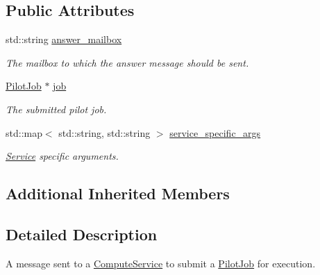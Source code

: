 \subsection*{Public Attributes}
\begin{DoxyCompactItemize}
\item 
\mbox{\label{classwrench_1_1_compute_service_submit_pilot_job_request_message_a7f6ae704e92a873bcaaa87972b66e420}} 
std\+::string \hyperlink{classwrench_1_1_compute_service_submit_pilot_job_request_message_a7f6ae704e92a873bcaaa87972b66e420}{answer\+\_\+mailbox}
\begin{DoxyCompactList}\small\item\em The mailbox to which the answer message should be sent. \end{DoxyCompactList}\item 
\mbox{\label{classwrench_1_1_compute_service_submit_pilot_job_request_message_a07c2cfde168dec83195c0836671acbe7}} 
\hyperlink{classwrench_1_1_pilot_job}{Pilot\+Job} $\ast$ \hyperlink{classwrench_1_1_compute_service_submit_pilot_job_request_message_a07c2cfde168dec83195c0836671acbe7}{job}
\begin{DoxyCompactList}\small\item\em The submitted pilot job. \end{DoxyCompactList}\item 
\mbox{\label{classwrench_1_1_compute_service_submit_pilot_job_request_message_af88e80196f64d6530548dbe17df006de}} 
std\+::map$<$ std\+::string, std\+::string $>$ \hyperlink{classwrench_1_1_compute_service_submit_pilot_job_request_message_af88e80196f64d6530548dbe17df006de}{service\+\_\+specific\+\_\+args}
\begin{DoxyCompactList}\small\item\em \hyperlink{classwrench_1_1_service}{Service} specific arguments. \end{DoxyCompactList}\end{DoxyCompactItemize}
\subsection*{Additional Inherited Members}


\subsection{Detailed Description}
A message sent to a \hyperlink{classwrench_1_1_compute_service}{Compute\+Service} to submit a \hyperlink{classwrench_1_1_pilot_job}{Pilot\+Job} for execution. 

